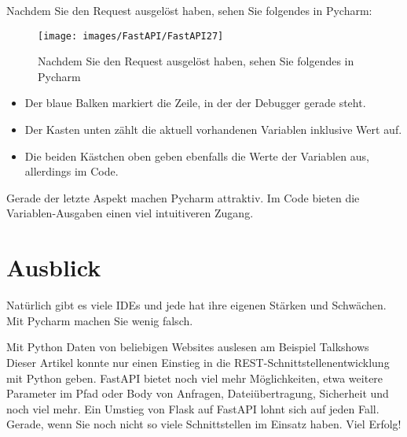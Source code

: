 Nachdem Sie den Request ausgelöst haben, sehen Sie folgendes in Pycharm:

\begin{figure}
    \texttt{[image: images/FastAPI/FastAPI27]}
    \caption{Nachdem Sie den Request ausgelöst haben, sehen Sie folgendes in Pycharm} \label{FastAPI27}
\end{figure}

\begin{itemize}
  \item Der blaue Balken markiert die Zeile, in der der Debugger gerade steht.
  \item Der Kasten unten zählt die aktuell vorhandenen Variablen inklusive Wert auf.
  \item Die beiden Kästchen oben geben ebenfalls die Werte der Variablen aus, allerdings im Code.
\end{itemize}

Gerade der letzte Aspekt machen Pycharm attraktiv. Im Code bieten die Variablen-Ausgaben einen viel intuitiveren Zugang.

\section{Ausblick}

Natürlich gibt es viele IDEs und jede hat ihre eigenen Stärken und Schwächen. Mit Pycharm machen Sie wenig falsch.


Mit Python Daten von beliebigen Websites auslesen am Beispiel Talkshows
Dieser Artikel konnte nur einen Einstieg in die REST-Schnittstellenentwicklung mit Python geben. FastAPI bietet noch viel mehr Möglichkeiten, etwa weitere Parameter im Pfad oder Body von Anfragen, Dateiübertragung, Sicherheit und noch viel mehr. Ein Umstieg von Flask auf FastAPI lohnt sich auf jeden Fall. Gerade, wenn Sie noch nicht so viele Schnittstellen im Einsatz haben. Viel Erfolg!